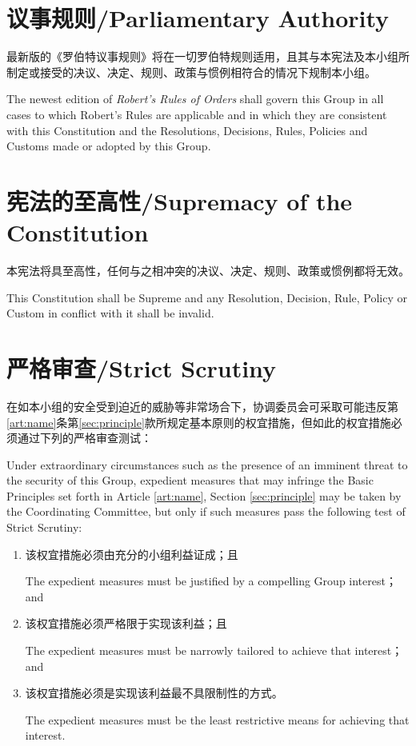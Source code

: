 \documentclass[12pt]{aspasia-constitution}
\begin{document}
	\section{议事规则/Parliamentary Authority} \label{sec:parliamentary}
	
	最新版的《罗伯特议事规则》将在一切罗伯特规则适用，且其与本宪法及本小组所制定或接受的决议、决定、规则、政策与惯例相符合的情况下规制本小组。
	
	The newest edition of \textit{Robert's Rules of Orders} shall govern this Group in all cases to which Robert's Rules are applicable and in which they are consistent with this Constitution and the Resolutions, Decisions, Rules, Policies and Customs made or adopted by this Group.
	
	\section{宪法的至高性/Supremacy of the Constitution} \label{sec:supremacy}
	
	本宪法将具至高性，任何与之相冲突的决议、决定、规则、政策或惯例都将无效。
	
	This Constitution shall be Supreme and any Resolution, Decision, Rule, Policy or Custom in conflict with it shall be invalid.
	
	\section{严格审查/Strict Scrutiny} \label{sec:strict-scrutiny}
	
	在如本小组的安全受到迫近的威胁等非常场合下，协调委员会可采取可能违反第\ref{art:name}条第\ref{sec:principle}款所规定基本原则的权宜措施，但如此的权宜措施必须通过下列的严格审查测试：
	
	Under extraordinary circumstances such as the presence of an imminent threat to the security of this Group, expedient measures that may infringe the Basic Principles set forth in Article \ref{art:name}, Section \ref{sec:principle} may be taken by the Coordinating Committee, but only if such measures pass the following test of Strict Scrutiny:
	
	\begin{enumerate}[leftmargin=1.25cm]
	\item 该权宜措施必须由充分的小组利益证成；且\par
	The expedient measures must be justified by a compelling Group interest； and
	\item  该权宜措施必须严格限于实现该利益；且\par
	The expedient measures must be narrowly tailored to achieve that interest； and
	\item 该权宜措施必须是实现该利益最不具限制性的方式。\par
	The expedient measures must be the least restrictive means for achieving that interest.
	\end{enumerate}
\end{document}
